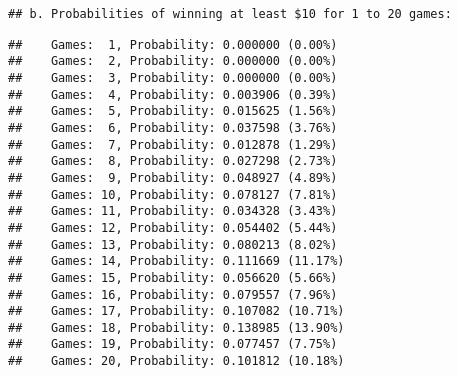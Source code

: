 \documentclass[
]{article}
\newenvironment{Shaded}{\begin{snugshade}}{\end{snugshade}}
\newcommand{\ControlFlowTok}[1]{\textcolor[rgb]{0.13,0.29,0.53}{\textbf{#1}}}
\newcommand{\DecValTok}[1]{\textcolor[rgb]{0.00,0.00,0.81}{#1}}
\newcommand{\FunctionTok}[1]{\textcolor[rgb]{0.13,0.29,0.53}{\textbf{#1}}}
\newcommand{\NormalTok}[1]{#1}
\newcommand{\SpecialCharTok}[1]{\textcolor[rgb]{0.81,0.36,0.00}{\textbf{#1}}}
\newcommand{\StringTok}[1]{\textcolor[rgb]{0.31,0.60,0.02}{#1}}
\begin{document}
\begin{verbatim}
## b. Probabilities of winning at least $10 for 1 to 20 games:
\end{verbatim}

\begin{Shaded}
\end{Shaded}

\begin{verbatim}
##    Games:  1, Probability: 0.000000 (0.00%)
##    Games:  2, Probability: 0.000000 (0.00%)
##    Games:  3, Probability: 0.000000 (0.00%)
##    Games:  4, Probability: 0.003906 (0.39%)
##    Games:  5, Probability: 0.015625 (1.56%)
##    Games:  6, Probability: 0.037598 (3.76%)
##    Games:  7, Probability: 0.012878 (1.29%)
##    Games:  8, Probability: 0.027298 (2.73%)
##    Games:  9, Probability: 0.048927 (4.89%)
##    Games: 10, Probability: 0.078127 (7.81%)
##    Games: 11, Probability: 0.034328 (3.43%)
##    Games: 12, Probability: 0.054402 (5.44%)
##    Games: 13, Probability: 0.080213 (8.02%)
##    Games: 14, Probability: 0.111669 (11.17%)
##    Games: 15, Probability: 0.056620 (5.66%)
##    Games: 16, Probability: 0.079557 (7.96%)
##    Games: 17, Probability: 0.107082 (10.71%)
##    Games: 18, Probability: 0.138985 (13.90%)
##    Games: 19, Probability: 0.077457 (7.75%)
##    Games: 20, Probability: 0.101812 (10.18%)
\end{verbatim}
\end{document}
